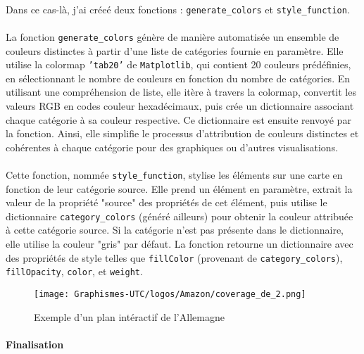 \paragraph{}
\vspace{-2em}
Dans ce cas-là, j'ai créeé deux fonctions : \texttt{generate\_colors} et \texttt{style\_function}. 
\paragraph{}
\vspace{-2em}
La fonction \texttt{generate\_colors} génère de manière automatisée un ensemble de couleurs distinctes à partir d'une liste de catégories fournie en paramètre. Elle utilise la colormap \texttt{'tab20'} de \texttt{Matplotlib}, qui contient 20 couleurs prédéfinies, en sélectionnant le nombre de couleurs en fonction du nombre de catégories. En utilisant une compréhension de liste, elle itère à travers la colormap, convertit les valeurs RGB en codes couleur hexadécimaux, puis crée un dictionnaire associant chaque catégorie à sa couleur respective. Ce dictionnaire est ensuite renvoyé par la fonction. Ainsi, elle simplifie le processus d'attribution de couleurs distinctes et cohérentes à chaque catégorie pour des graphiques ou d'autres visualisations.

\paragraph{}
\vspace{-2em}
Cette fonction, nommée \texttt{style\_function}, stylise les éléments sur une carte en fonction de leur catégorie source. Elle prend un élément en paramètre, extrait la valeur de la propriété "source" des propriétés de cet élément, puis utilise le dictionnaire \texttt{category\_colors} (généré ailleurs) pour obtenir la couleur attribuée à cette catégorie source. Si la catégorie n'est pas présente dans le dictionnaire, elle utilise la couleur "gris" par défaut. La fonction retourne un dictionnaire avec des propriétés de style telles que \texttt{fillColor} (provenant de \texttt{category\_colors}), \texttt{fillOpacity}, \texttt{color}, et \texttt{weight}. 
    \begin{figure}[H]
    \centering
    \texttt{[image: Graphismes-UTC/logos/Amazon/coverage\_de\_2.png]}
    \caption{Exemple d'un plan intéractif de l'Allemagne}
    \end{figure}

\paragraph{}
\vspace{-2em}
{\large\textbf{Finalisation}}
